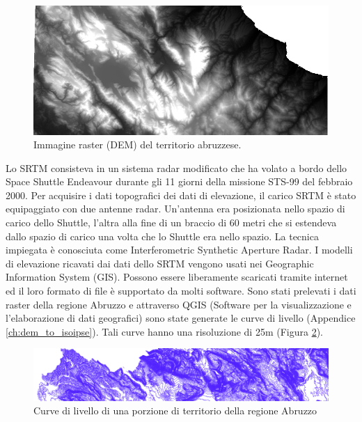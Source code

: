 \begin{figure}[h]
	\centering
	\includegraphics[width=1\textwidth]{images/STRM.PNG}
	\caption{Immagine raster (DEM) del territorio abruzzese.}
	\label{fig:raster_abruzzo}
\end{figure}

Lo SRTM consisteva in un sistema radar modificato che ha volato a bordo dello Space Shuttle Endeavour durante gli 11 giorni della missione STS-99 del febbraio 2000. Per acquisire i dati topografici dei dati di elevazione, il carico SRTM è stato equipaggiato con due antenne radar. Un'antenna era posizionata nello spazio di carico dello Shuttle, l'altra alla fine di un braccio di 60 metri che si estendeva dallo spazio di carico una volta che lo Shuttle era nello spazio. La tecnica impiegata è conosciuta come Interferometric Synthetic Aperture Radar. \newline I modelli di elevazione ricavati dai dati dello SRTM vengono usati nei Geographic Information System (GIS). Possono essere liberamente scaricati tramite internet ed il loro formato di file è supportato da molti software. Sono stati prelevati i dati raster della regione Abruzzo e attraverso QGIS (Software per la visualizzazione e l'elaborazione di dati geografici) sono state generate le curve di livello (Appendice \ref{ch:dem_to_isoipse}). Tali curve hanno una risoluzione di 25m (Figura \ref{fig:curve_di_livello}).

\begin{figure}[h]
	\centering
	\includegraphics[width=1\textwidth]{images/dettaglioCurve.PNG}
	\caption{Curve di livello di una porzione di territorio della regione Abruzzo}
	\label{fig:curve_di_livello}
\end{figure}

